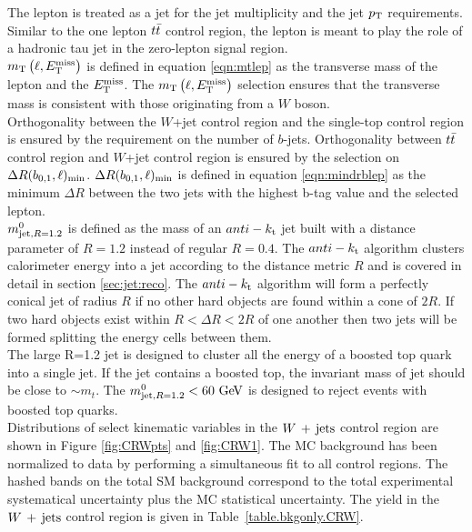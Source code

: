 \indent The lepton is treated as a jet for the jet multiplicity and the jet $p_{\mathrm{T}}$ requirements.  Similar to the one lepton $t\bar{t}$ control region, the lepton is meant to play the role of a hadronic tau jet in the zero-lepton signal region.  \\

\indent $m_{\mathrm{T}}\left(\ell,E_{\mathrm{T}}^{\mathrm{miss}}\right)$ is defined in equation \ref{eqn:mtlep} as the transverse mass of the lepton and the $E_{\mathrm{T}}^{\mathrm{miss}}$.  The $m_{\mathrm{T}}\left(\ell,E_{\mathrm{T}}^{\mathrm{miss}}\right)$ selection ensures that the transverse mass is consistent with those originating from a $W$ boson.  \\

\indent Orthogonality between the $W$+jet control region and the single-top control region is ensured by the requirement on the number of $b$-jets.  Orthogonality between $t\bar{t}$ control region and $W$+jet control region is ensured by the selection on $\Delta R(b_{0,1},\ell)_{\mathrm{min}}$.  $\Delta R(b_{0,1},\ell)_{\mathrm{min}}$ is defined in equation \ref{eqn:mindrblep} as the minimum $\Delta R$ between the two jets with the highest b-tag value and the selected lepton. \\

\indent $m^{0}_{\mathrm{jet,}R=1.2}$ is defined as the mass of an $anti-k_{\rm{t}}$ jet built with a distance parameter of $R=1.2$ instead of regular $R=0.4$.  The $anti-k_{\rm{t}}$ algorithm clusters calorimeter energy into a jet according to the distance metric $R$ and is covered in detail in section \ref{sec:jet:reco}.  The $anti-k_{\rm{t}}$ algorithm will form a perfectly conical jet of radius $R$ if no other hard objects are found within a cone of $2R$.  If two hard objects exist within $R<\Delta R<2R$ of one another then two jets will be formed splitting the energy cells between them.  \\

\indent The large R=1.2 jet is designed to cluster all the energy of a boosted top quark into a single jet.  If the jet contains a boosted top, the invariant mass of jet should be close to $\sim m_t$. The $\mantikttwelvezero < 60 \gev$ is designed to reject events with boosted top quarks.  \\

\indent  Distributions of select kinematic variables in the $W\,+\,\mathrm{jets}$ control region are shown in Figure \ref{fig:CRWpts} and \ref{fig:CRW1}.  The MC background has been normalized to data by performing a simultaneous fit to all control regions.  The hashed bands on the total SM background correspond to the total experimental systematical uncertainty plus the MC statistical uncertainty.  The yield in the $W\,+\,\mathrm{jets}$ control region is given in Table~\ref{table.bkgonly.CRW}.  \\

